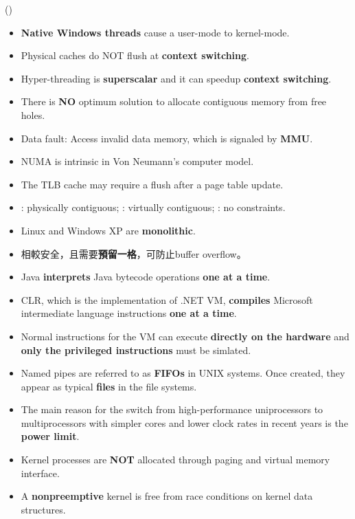 \begin{theorem}{()} \quad\quad \begin{itemize}
        \item \textbf{Native Windows threads} cause a user-mode to kernel-mode.
        \item Physical caches do NOT flush at \textbf{context switching}.
        \item Hyper-threading is \textbf{superscalar} and it can speedup \textbf{context switching}.
        \item There is \textbf{NO} optimum solution to allocate contiguous memory from free holes.
        \item Data fault: Access invalid data memory, which is signaled by \textbf{MMU}.
        \item NUMA is intrinsic in Von Neumann's computer model.
        \item The TLB cache may require a flush after a page table update.
        \item {}: physically contiguous; : virtually contiguous; : no constraints.
        \item Linux and Windows XP are \textbf{monolithic}.
        \item {}相較安全，且需要\textbf{預留一格}，可防止buffer overflow。
        \item Java \textbf{interprets} Java bytecode operations \textbf{one at a time}.
        \item CLR, which is the implementation of .NET VM, \textbf{compiles} Microsoft intermediate language instructions \textbf{one at a time}.
        \item Normal instructions for the VM can execute \textbf{directly on the hardware} and \textbf{only the privileged instructions} must be simlated.
        \item Named pipes are referred to as \textbf{FIFOs} in UNIX systems. Once created, they appear as typical \textbf{files} in the file systems. 
        \item The main reason for the switch from high-performance uniprocessors to multiprocessors with simpler cores and lower clock rates in recent years is the \textbf{power limit}.
        \item Kernel processes are \textbf{NOT} allocated through paging and virtual memory interface.
        \item A \textbf{nonpreemptive} kernel is free from race conditions on kernel data structures.

\end{itemize}
\end{theorem}

